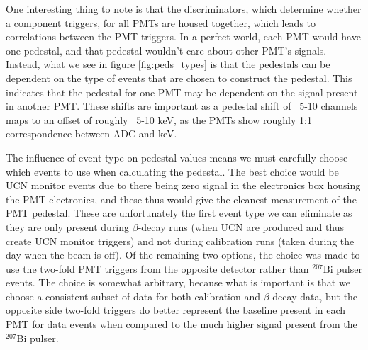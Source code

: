 One interesting thing to note is that the discriminators, which determine whether
a component triggers,
for all PMTs are housed 
together, which leads to correlations between the PMT triggers. In a perfect world, 
each PMT would have one pedestal, and that pedestal wouldn't care about other PMT's signals.
Instead, what we see in figure \ref{fig:peds_types} is that the pedestals
can be dependent on the type of events that are chosen 
to construct the pedestal. This indicates that the pedestal for one PMT may be dependent
on the signal present in another PMT. These shifts are important as a
pedestal shift of ~5-10 channels maps to an offset of roughly
~5-10 keV, as the PMTs show roughly 1:1 correspondence between ADC and keV.

The influence of event type on pedestal values means we must carefully choose which events
to use when calculating the pedestal.
The best choice would be UCN monitor events due to there being zero signal 
in the electronics box housing the PMT electronics, and these thus would give
the cleanest measurement of the PMT pedestal.
These are unfortunately the first event type we can eliminate as they are only present
during $\beta$-decay runs (when UCN are produced and thus create UCN monitor triggers)
and not during calibration runs (taken during the day when the beam is off). 
Of the remaining two options, the choice was made to use the
two-fold PMT triggers from the opposite detector rather than $^{207}\mathrm{Bi}$ pulser
events. The choice is somewhat arbitrary, because what is important is that we choose
a consistent subset of data for both calibration and $\beta$-decay data, but the
opposite side two-fold triggers do better represent the baseline present in each PMT
for data events when compared to the much higher signal present from the $^{207}\mathrm{Bi}$
pulser.


